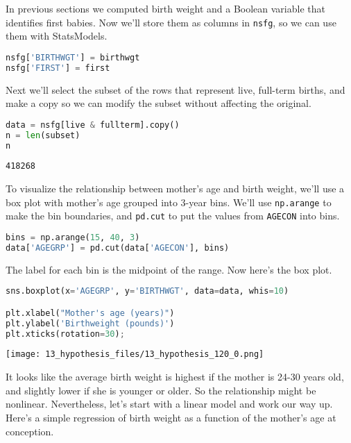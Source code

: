In previous sections we computed birth weight and a Boolean variable
that identifies first babies. Now we'll store them as columns in
\passthrough{\lstinline!nsfg!}, so we can use them with StatsModels.

\begin{lstlisting}[language=Python,style=source]
nsfg['BIRTHWGT'] = birthwgt
nsfg['FIRST'] = first
\end{lstlisting}

Next we'll select the subset of the rows that represent live, full-term
births, and make a copy so we can modify the subset without affecting
the original.

\begin{lstlisting}[language=Python,style=source]
data = nsfg[live & fullterm].copy()
n = len(subset)
n
\end{lstlisting}

\begin{lstlisting}[style=output]
418268
\end{lstlisting}

To visualize the relationship between mother's age and birth weight,
we'll use a box plot with mother's age grouped into 3-year bins. We'll
use \passthrough{\lstinline!np.arange!} to make the bin boundaries, and
\passthrough{\lstinline!pd.cut!} to put the values from
\passthrough{\lstinline!AGECON!} into bins.

\begin{lstlisting}[language=Python,style=source]
bins = np.arange(15, 40, 3)
data['AGEGRP'] = pd.cut(data['AGECON'], bins)
\end{lstlisting}

The label for each bin is the midpoint of the range. Now here's the box
plot.

\begin{lstlisting}[language=Python,style=source]
sns.boxplot(x='AGEGRP', y='BIRTHWGT', data=data, whis=10)

plt.xlabel("Mother's age (years)")
plt.ylabel('Birthweight (pounds)')
plt.xticks(rotation=30);
\end{lstlisting}

\begin{center}
\texttt{[image: 13\_hypothesis\_files/13\_hypothesis\_120\_0.png]}
\end{center}

It looks like the average birth weight is highest if the mother is 24-30
years old, and slightly lower if she is younger or older. So the
relationship might be nonlinear. Nevertheless, let's start with a linear
model and work our way up. Here's a simple regression of birth weight as
a function of the mother's age at conception.

